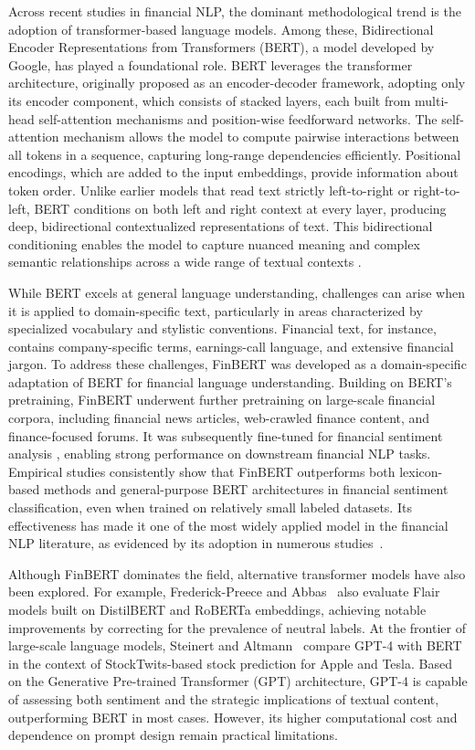 Across recent studies in financial NLP, the dominant methodological trend is the adoption of transformer-based language models. Among these, Bidirectional Encoder Representations from Transformers (BERT), a model developed by Google, has played a foundational role. BERT leverages the transformer architecture, originally proposed as an encoder-decoder framework, adopting only its encoder component, which consists of stacked layers, each built from multi-head self-attention mechanisms and position-wise feedforward networks. The self-attention mechanism allows the model to compute pairwise interactions between all tokens in a sequence, capturing long-range dependencies efficiently. Positional encodings, which are added to the input embeddings, provide information about token order. Unlike earlier models that read text strictly left-to-right or right-to-left, BERT conditions on both left and right context at every layer, producing deep, bidirectional contextualized representations of text. This bidirectional conditioning enables the model to capture nuanced meaning and complex semantic relationships across a wide range of textual contexts \cite{34hf8}.

While BERT excels at general language understanding, challenges can arise when it is applied to domain-specific text, particularly in areas characterized by specialized vocabulary and stylistic conventions. Financial text, for instance, contains company-specific terms, earnings-call language, and extensive financial jargon. To address these challenges, FinBERT was developed as a domain-specific adaptation of BERT for financial language understanding. Building on BERT's pretraining, FinBERT underwent further pretraining on large-scale financial corpora, including financial news articles, web-crawled finance content, and finance-focused forums. It was subsequently fine-tuned for financial sentiment analysis \cite{rjhc3}, enabling strong performance on downstream financial NLP tasks. Empirical studies consistently show that FinBERT outperforms both lexicon-based methods and general-purpose BERT architectures in financial sentiment classification, even when trained on relatively small labeled datasets. Its effectiveness has made it one of the most widely applied model in the financial NLP literature, as evidenced by its adoption in numerous studies~\cite{d892a, 339f6, 34309, de270, 5530e, 93d76}.

Although FinBERT dominates the field, alternative transformer models have also been explored. For example, Frederick-Preece and Abbas~\cite{2b4c0} also evaluate Flair models built on DistilBERT and RoBERTa embeddings, achieving notable improvements by correcting for the prevalence of neutral labels. At the frontier of large-scale language models, Steinert and Altmann~\cite{a12be} compare GPT-4 with BERT in the context of StockTwits-based stock prediction for Apple and Tesla. Based on the Generative Pre-trained Transformer (GPT) architecture, GPT-4 is capable of assessing both sentiment and the strategic implications of textual content, outperforming BERT in most cases. However, its higher computational cost and dependence on prompt design remain practical limitations.

